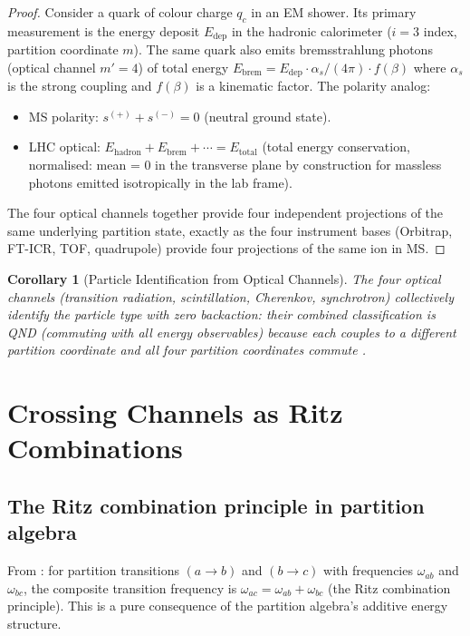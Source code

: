 \documentclass[twocolumn,10pt,a4paper]{article}
\theoremstyle{thmstyle}
\newtheorem{corollary}[theorem]{Corollary}
\theoremstyle{definition}
\theoremstyle{remark}
\begin{document}
\begin{proof}
Consider a quark of colour charge $q_c$ in an EM shower.  Its primary
measurement is the energy deposit $E_\text{dep}$ in the hadronic calorimeter
($i = 3$ index, partition coordinate $m$).  The same quark also emits
bremsstrahlung photons (optical channel $m' = 4$) of total energy
$E_\text{brem} = E_\text{dep} \cdot \alpha_s / (4\pi) \cdot f(\beta)$
where $\alpha_s$ is the strong coupling and $f(\beta)$ is a kinematic
factor.  The polarity analog:
\begin{itemize}[nosep]
\item MS polarity: $s^{(+)} + s^{(-)} = 0$ (neutral ground state).
\item LHC optical: $E_\text{hadron} + E_\text{brem} + \cdots
  = E_\text{total}$ (total energy conservation, normalised: mean = 0 in
  the transverse plane by construction for massless photons emitted
  isotropically in the lab frame).
\end{itemize}
The four optical channels together provide four independent projections
of the same underlying partition state, exactly as the four instrument
bases (Orbitrap, FT-ICR, TOF, quadrupole) provide four projections of the
same ion in MS.
\end{proof}

\begin{corollary}[Particle Identification from Optical Channels]
The four optical channels (transition radiation, scintillation, Cherenkov,
synchrotron) collectively identify the particle type with zero backaction:
their combined classification is QND (commuting with all energy observables)
because each couples to a different partition coordinate and all four
partition coordinates commute \citep{companion:qnd}.
\end{corollary}

\section{Crossing Channels as Ritz Combinations}
\label{sec:crossing}

\subsection{The Ritz combination principle in partition algebra}

From \citet{companion:recursive}: for partition transitions $(a \to b)$
and $(b \to c)$ with frequencies $\omega_{ab}$ and $\omega_{bc}$, the
composite transition frequency is $\omega_{ac} = \omega_{ab} + \omega_{bc}$
(the Ritz combination principle).  This is a pure consequence of the
partition algebra's additive energy structure.
\end{document}

